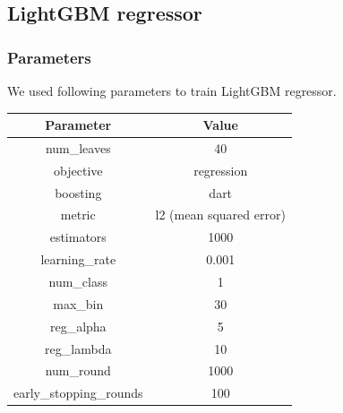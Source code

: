 \documentclass[final,2p]{elsarticle}
\begin{document}
\subsection{LightGBM regressor}

\subsubsection{Parameters}
We used following parameters to train LightGBM regressor. 

\begin{center}
\begin{tabular}{cc}
    Parameter & Value \\
    \hline
    num\_leaves & 40 \\
    objective & regression \\
    boosting & dart \\
    metric & l2 (mean squared error) \\
    estimators & 1000 \\
    learning\_rate & 0.001 \\
    num\_class & 1 \\
    max\_bin & 30 \\
    reg\_alpha & 5 \\
    reg\_lambda & 10 \\
    num\_round & 1000 \\
    early\_stopping\_rounds & 100 \\
\end{tabular}
\end{center}
\end{document}
